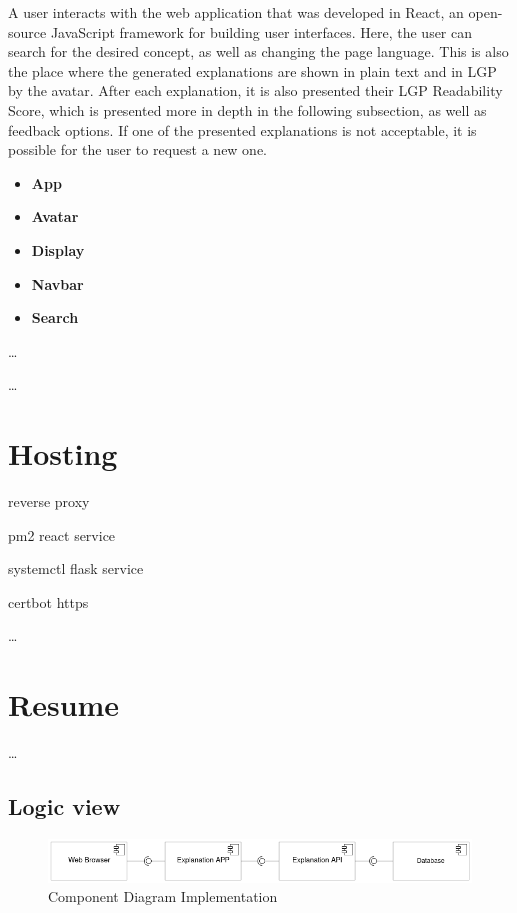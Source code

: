 A user interacts with the web application that was developed in React, an open-source JavaScript framework for building user interfaces.
Here, the user can search for the desired concept, as well as changing the page language.
This is also the place where the generated explanations are shown in plain text and in \gls{LGP} by the avatar.
After each explanation, it is also presented their \gls{LGP} Readability Score, which is presented more in depth in the following subsection, as well as feedback options.
If one of the presented explanations is not acceptable, it is possible for the user to request a new one.

\begin{itemize}
    \item \textbf{App}
    \item \textbf{Avatar}
    \item \textbf{Display}
    \item \textbf{Navbar}
    \item \textbf{Search}
\end{itemize}

\dots %

\dots %

\section{Hosting}

reverse proxy

pm2 react service

systemctl flask service

certbot https

\dots %

\section{Resume}

\dots %

\subsection{Logic view}

\begin{figure}[H]
\centering
\includegraphics[width=\textwidth,keepaspectratio]{ch5/assets/component_diagram_Implement.png}
\caption[Component Diagram Implementation]{Component Diagram Implementation}
\label{fig:componentImp}
\end{figure}

